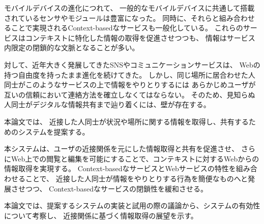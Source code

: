 


\begin{jabstract}

モバイルデバイスの進化につれて、
一般的なモバイルデバイスに共通して搭載されているセンサやモジュールは豊富になった。
同時に、それらと組み合わせることで実現されるContext-basedなサービスも一般化している。
これらのサービスはコンテキストに特化した情報の取得を促進させつつも、
情報はサービス内限定の閉鎖的な文脈となることが多い。

対して、近年大きく発展してきたSNSやコミュニケーションサービスは、
Webの持つ自由度を持ったまま進化を続けてきた。
しかし、同じ場所に居合わせた人同士がこのようなサービスの上で情報をやりとりするには
あらかじめユーザが互いの信頼において連絡方法を確立しなくてはならない。
そのため、見知らぬ人同士がデジタルな情報共有まで辿り着くには、壁が存在する。

本論文では、
近接した人同士が状況や場所に関する情報を取得し、共有するためのシステムを提案する。

本システムは、ユーザの近接関係を元にした情報取得と共有を促進させ、
さらにWeb上での閲覧と編集を可能にすることで、コンテキストに対するWebからの情報取得を実現する。
Context-basedなサービスとWebサービスの特性を組み合わせることで、
近接した人同士が情報をやりとりする行為を簡便なものへと発展させつつ、
Context-basedなサービスの閉鎖性を緩和させる。

本論文では、提案するシステムの実装と試用の際の議論から、システムの有効性について考察し、
近接関係に基づく情報取得の展望を示す。


\end{jabstract}



